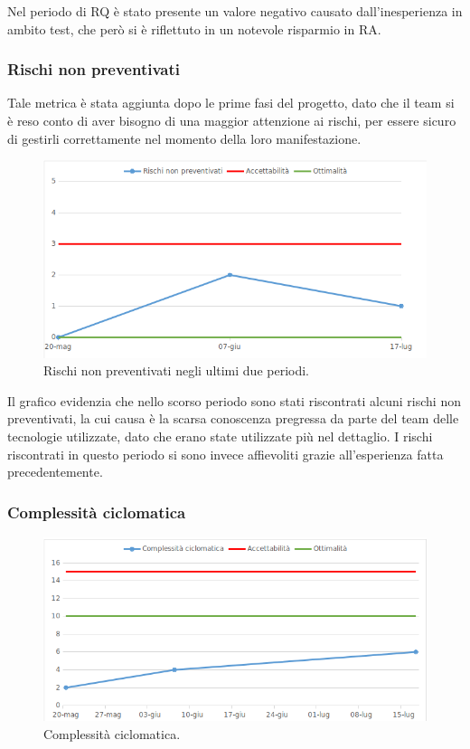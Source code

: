 Nel periodo di RQ è stato presente un valore negativo causato dall'inesperienza in ambito test, che però si è riflettuto in un notevole risparmio in RA.

\newpage

\subsubsection{Rischi non preventivati}

Tale metrica è stata aggiunta dopo le prime fasi del progetto, dato che il team si è reso conto di aver bisogno di una maggior attenzione ai rischi, per essere sicuro di gestirli correttamente nel momento della loro manifestazione.

\begin{figure}[h!]
	\centering
	\includegraphics[scale=0.75]{img/Grafici/Rischi.png}
	\caption{Rischi non preventivati negli ultimi due periodi.}
	\label{fig:Rischi}
\end{figure}

Il grafico evidenzia che nello scorso periodo sono stati riscontrati alcuni rischi non preventivati, la cui causa è la scarsa conoscenza pregressa da parte del team delle tecnologie utilizzate, dato che erano state utilizzate più nel dettaglio. I rischi riscontrati in questo periodo si sono invece affievoliti grazie all'esperienza fatta precedentemente.

\subsubsection{Complessità ciclomatica}

\begin{figure}[h!]
	\centering
	\includegraphics[scale=0.75]{img/Grafici/ciclomatica.png}
	\caption{Complessità ciclomatica.}
	\label{fig:Ciclomatica}
\end{figure}


